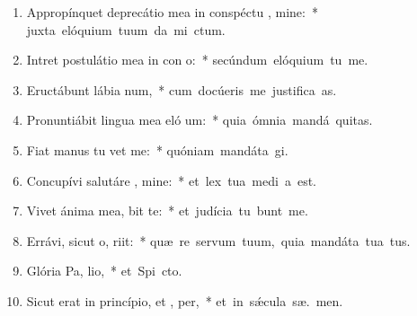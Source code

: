 \begin{flushleft}
\begin{enumerate}[leftmargin=*]

\item Appropínquet deprecátio mea in conspéctu , mine:~* \mbox{juxta elóquium tuum da mi ctum.}
\item Intret postulátio mea in con o:~* \mbox{secúndum elóquium tu  me.}
\item Eructábunt lábia  num,~* \mbox{cum docúeris me justifica as.}
\item Pronuntiábit lingua mea eló um:~* \mbox{quia ómnia mandá  \textaccent{\'{\ae}}quitas.}
\item Fiat manus tu  vet me:~* \mbox{quóniam mandáta  gi.}
\item Concupívi salutáre , mine:~* \mbox{et lex tua medi a est.}
\item Vivet ánima mea,  bit te:~* \mbox{et judícia tu bunt me.}
\item Errávi, sicut o,  riit:~* \mbox{quæ re servum tuum, quia mandáta tua   tus.}
\item Glória Pa,  lio,~* \mbox{et Spi cto.}
\item Sicut erat in princípio, et ,  per,~* \mbox{et in s\'{\ae}cula sæ. men.}


\end{enumerate}
\end{flushleft}

